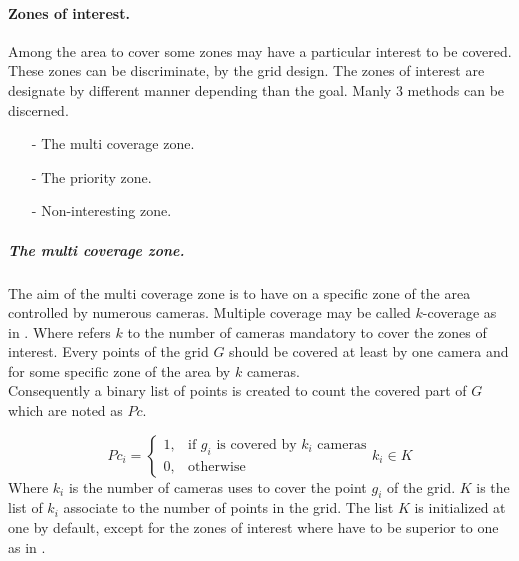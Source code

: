 \paragraph*{Zones of interest.} 
Among the area to cover some zones may have a particular interest to be covered. These zones can be discriminate, by the grid design. 
The zones of interest are designate by different manner depending than the goal. Manly 3 methods can be discerned.
\begin{itemize}
	\item[-]	The multi coverage zone. 
	\item[-]	The priority zone.  
	\item[-]	Non-interesting zone.
\end{itemize}
 

\subparagraph{The multi coverage zone.}
The aim  of the multi coverage zone is to have on a specific zone of the area controlled by numerous cameras.  Multiple coverage may be called $k$-coverage as in \cite{174*zhang2016}. Where refers $k$ to the number of cameras mandatory to cover the zones of interest. 
Every points of the grid $G$ should be covered at least by one camera and for some specific zone of the area by $k$ cameras.\\
 Consequently a binary list of points is created to count the covered part of $G$ which are noted as $Pc$.

\begin{equation}\label{eq:PciK}
Pc_i= \begin{cases} 1, & \mbox{if } g_i\mbox{ is covered by $k_i$ cameras} \\ 0, & \mbox{otherwise}   \end{cases}k_i \in K
\end{equation}
Where $k_i$ is the number of cameras uses to cover the point $g_i$ of the grid. $K$ is the list of $k_i$ associate to the number of points in the grid. The list $K$ is initialized at one by default, except for the zones of interest where have to be superior to one as in \cite{82*chrysostomou2012}. 

